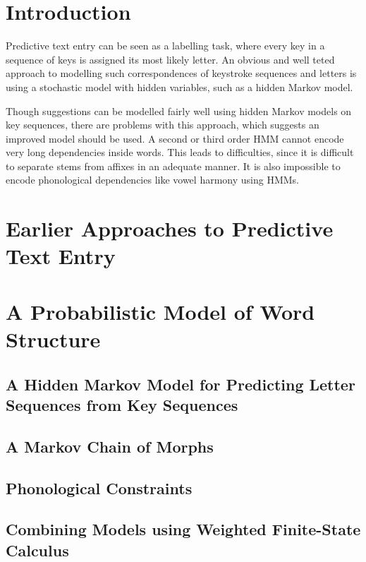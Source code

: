 \documentclass{llncs}
\begin{document}
\section{Introduction}

Predictive text entry can be seen as a labelling task, where every key
in a sequence of keys is assigned its most likely letter. An obvious
and well teted approach to modelling such correspondences of keystroke
sequences and letters is using a stochastic model with hidden
variables, such as a hidden Markov model.

Though suggestions can be modelled fairly well using hidden Markov
models on key sequences, there are problems with this approach, which
suggests an improved model should be used. A second or third order HMM
cannot encode very long dependencies inside words. This leads to
difficulties, since it is difficult to separate stems from affixes in
an adequate manner. It is also impossible to encode phonological
dependencies like vowel harmony using HMMs.


\section{Earlier Approaches to Predictive Text Entry}

\section{A Probabilistic Model of Word Structure}

\subsection{A Hidden Markov Model for Predicting Letter Sequences from Key Sequences}

\subsection{A Markov Chain of Morphs}

\subsection{Phonological Constraints}

\subsection{Combining Models using Weighted Finite-State Calculus}
\end{document}
